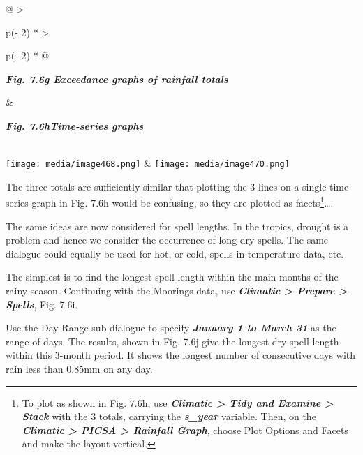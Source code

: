 \documentclass[
  letterpaper,
  DIV=11,
  numbers=noendperiod]{scrreprt}
\begin{document}
\begin{longtable}[]{@{}
  >{\raggedright\arraybackslash}p{(\columnwidth - 2\tabcolsep) * }
  >{\raggedright\arraybackslash}p{(\columnwidth - 2\tabcolsep) * }@{}}
\toprule\noalign{}
\begin{minipage}[b]{\linewidth}\raggedright
\textbf{\emph{Fig. 7.6g Exceedance graphs of rainfall totals}}
\end{minipage} & \begin{minipage}[b]{\linewidth}\raggedright
\textbf{\emph{Fig. 7.6hTime-series graphs}}
\end{minipage} \\
\midrule\noalign{}
\endhead
\bottomrule\noalign{}
\endlastfoot
\texttt{[image: media/image468.png]} &
\texttt{[image: media/image470.png]} \\
\end{longtable}

The three totals are sufficiently similar that plotting the 3 lines on a
single time-series graph in Fig. 7.6h would be confusing, so they are
plotted as facets\footnote{To plot as shown in Fig. 7.6h, use
  \textbf{\emph{Climatic \textgreater{} Tidy and Examine \textgreater{}
  Stack}} with the 3 totals, carrying the \textbf{\emph{s\_year}}
  variable. Then, on the \textbf{\emph{Climatic \textgreater{} PICSA
  \textgreater{} Rainfall Graph}}, choose Plot Options and Facets and
  make the layout vertical.}\ldots.

The same ideas are now considered for spell lengths. In the tropics,
drought is a problem and hence we consider the occurrence of long dry
spells. The same dialogue could equally be used for hot, or cold, spells
in temperature data, etc.

The simplest is to find the longest spell length within the main months
of the rainy season. Continuing with the Moorings data, use
\textbf{\emph{Climatic \textgreater{} Prepare \textgreater{} Spells}},
Fig. 7.6i.

Use the Day Range sub-dialogue to specify \textbf{\emph{January 1 to
March 31}} as the range of days. The results, shown in Fig. 7.6j give
the longest dry-spell length within this 3-month period. It shows the
longest number of consecutive days with rain less than 0.85mm on any
day.
\end{document}
